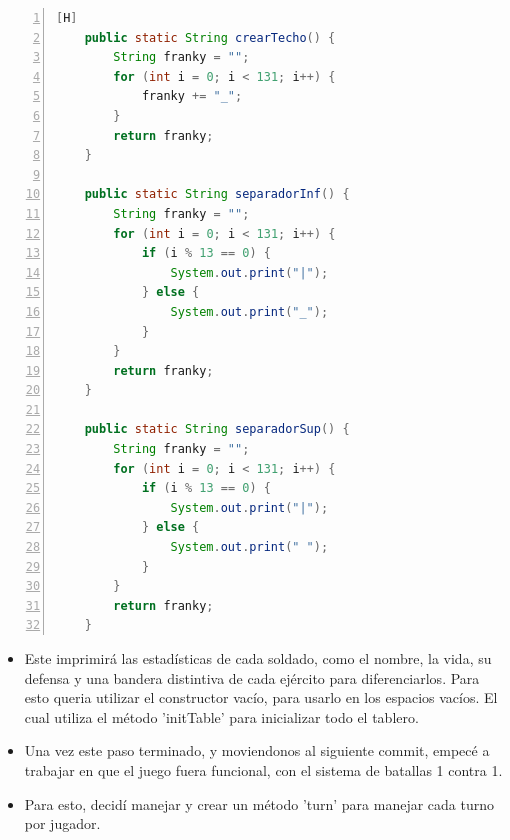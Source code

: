 \documentclass{article}
\begin{document}
\begin{lstlisting}[language=java,caption={Show Table and Init Table}, numbers=left][H]
    public static String crearTecho() {
        String franky = "";
        for (int i = 0; i < 131; i++) {
            franky += "_";
        }
        return franky;
    }

    public static String separadorInf() {
        String franky = "";
        for (int i = 0; i < 131; i++) {
            if (i % 13 == 0) {
                System.out.print("|");
            } else {
                System.out.print("_");
            }
        }
        return franky;
    }

    public static String separadorSup() {
        String franky = "";
        for (int i = 0; i < 131; i++) {
            if (i % 13 == 0) {
                System.out.print("|");
            } else {
                System.out.print(" ");
            }
        }
        return franky;
    }
	\end{lstlisting}
	\begin{itemize}	
		\item Este imprimirá las estadísticas de cada soldado, como el nombre, la vida, su defensa y una bandera distintiva de cada ejército para diferenciarlos. Para esto queria utilizar el constructor vacío, para usarlo en los espacios vacíos. El cual utiliza el método 'initTable' para inicializar todo el tablero.
		\item Una vez este paso terminado, y moviendonos al siguiente commit, empecé a trabajar en que el juego fuera funcional, con el sistema de batallas 1 contra 1.
		\item Para esto, decidí manejar y crear un método 'turn' para manejar cada turno por jugador.
	\end{itemize}
\end{document}
